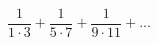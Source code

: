 \documentclass[12pt]{amsart}
\begin{document}
\sicpsize
\[
\frac{1}{1 \cdot 3} + \frac{1}{5 \cdot 7} + \frac{1}{9 \cdot 11} + ...  
\]
\end{document}

